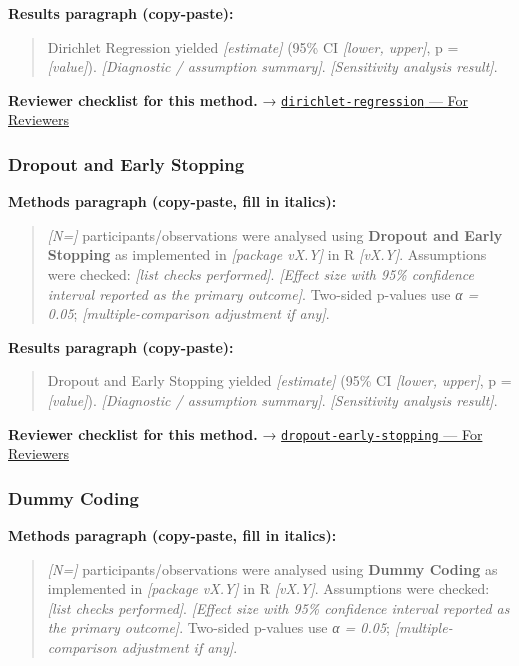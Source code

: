 \documentclass[
]{article}
\begin{document}
\textbf{Results paragraph (copy-paste):}

\begin{quote}
Dirichlet Regression yielded \emph{{[}estimate{]}} (95\% CI
\emph{{[}lower, upper{]}}, p = \emph{{[}value{]}}). \emph{{[}Diagnostic
/ assumption summary{]}}. \emph{{[}Sensitivity analysis result{]}}.
\end{quote}

\textbf{Reviewer checklist for this method.} →
\href{../chapters/07-regression/dirichlet-regression.Rmd\#for-reviewers}{\texttt{dirichlet-regression}
--- For Reviewers}

\subsubsection{Dropout and Early
Stopping}\label{dropout-and-early-stopping}

\textbf{Methods paragraph (copy-paste, fill in italics):}

\begin{quote}
\emph{{[}N={]}} participants/observations were analysed using
\textbf{Dropout and Early Stopping} as implemented in \emph{{[}package
vX.Y{]}} in R \emph{{[}vX.Y{]}}. Assumptions were checked: \emph{{[}list
checks performed{]}}. \emph{{[}Effect size with 95\% confidence interval
reported as the primary outcome{]}}. Two-sided p-values use \emph{α =
0.05}; \emph{{[}multiple-comparison adjustment if any{]}}.
\end{quote}

\textbf{Results paragraph (copy-paste):}

\begin{quote}
Dropout and Early Stopping yielded \emph{{[}estimate{]}} (95\% CI
\emph{{[}lower, upper{]}}, p = \emph{{[}value{]}}). \emph{{[}Diagnostic
/ assumption summary{]}}. \emph{{[}Sensitivity analysis result{]}}.
\end{quote}

\textbf{Reviewer checklist for this method.} →
\href{../chapters/13-ml/dropout-early-stopping.Rmd\#for-reviewers}{\texttt{dropout-early-stopping}
--- For Reviewers}

\subsubsection{Dummy Coding}\label{dummy-coding}

\textbf{Methods paragraph (copy-paste, fill in italics):}

\begin{quote}
\emph{{[}N={]}} participants/observations were analysed using
\textbf{Dummy Coding} as implemented in \emph{{[}package vX.Y{]}} in R
\emph{{[}vX.Y{]}}. Assumptions were checked: \emph{{[}list checks
performed{]}}. \emph{{[}Effect size with 95\% confidence interval
reported as the primary outcome{]}}. Two-sided p-values use \emph{α =
0.05}; \emph{{[}multiple-comparison adjustment if any{]}}.
\end{quote}
\end{document}
